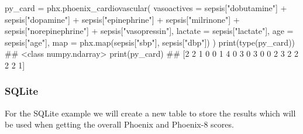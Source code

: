 \documentclass[
  letterpaper,
  DIV=11,
  numbers=noendperiod]{scrartcl}
\newenvironment{Shaded}{\begin{snugshade}}{\end{snugshade}}
\newcommand{\BuiltInTok}[1]{\textcolor[rgb]{0.00,0.23,0.31}{#1}}
\newcommand{\CommentTok}[1]{\textcolor[rgb]{0.37,0.37,0.37}{#1}}
\newcommand{\NormalTok}[1]{\textcolor[rgb]{0.00,0.23,0.31}{#1}}
\newcommand{\OperatorTok}[1]{\textcolor[rgb]{0.37,0.37,0.37}{#1}}
\newcommand{\StringTok}[1]{\textcolor[rgb]{0.13,0.47,0.30}{#1}}
\begin{document}
\begin{Shaded}
\begin{Highlighting}[]
\NormalTok{py\_card }\OperatorTok{=}\NormalTok{ phx.phoenix\_cardiovascular(}
\NormalTok{    vasoactives }\OperatorTok{=}\NormalTok{ sepsis[}\StringTok{"dobutamine"}\NormalTok{] }\OperatorTok{+}\NormalTok{ sepsis[}\StringTok{"dopamine"}\NormalTok{] }\OperatorTok{+}\NormalTok{ sepsis[}\StringTok{"epinephrine"}\NormalTok{] }\OperatorTok{+}
\NormalTok{                  sepsis[}\StringTok{"milrinone"}\NormalTok{] }\OperatorTok{+}\NormalTok{ sepsis[}\StringTok{"norepinephrine"}\NormalTok{] }\OperatorTok{+}\NormalTok{ sepsis[}\StringTok{"vasopressin"}\NormalTok{],}
\NormalTok{    lactate }\OperatorTok{=}\NormalTok{ sepsis[}\StringTok{"lactate"}\NormalTok{],}
\NormalTok{    age }\OperatorTok{=}\NormalTok{ sepsis[}\StringTok{"age"}\NormalTok{],}
    \BuiltInTok{map} \OperatorTok{=}\NormalTok{ phx.}\BuiltInTok{map}\NormalTok{(sepsis[}\StringTok{"sbp"}\NormalTok{], sepsis[}\StringTok{"dbp"}\NormalTok{])}
\NormalTok{)}
\BuiltInTok{print}\NormalTok{(}\BuiltInTok{type}\NormalTok{(py\_card))}
\CommentTok{\#\# \textless{}class \textquotesingle{}numpy.ndarray\textquotesingle{}\textgreater{}}
\BuiltInTok{print}\NormalTok{(py\_card)}
\CommentTok{\#\# [2 2 1 0 0 1 4 0 3 0 3 0 0 2 3 2 2 2 2 1]}
\end{Highlighting}
\end{Shaded}

\subsubsection{SQLite}\label{sqlite-1}

For the SQLite example we will create a new table to store the results
which will be used when getting the overall Phoenix and Phoenix-8
scores.
\end{document}
